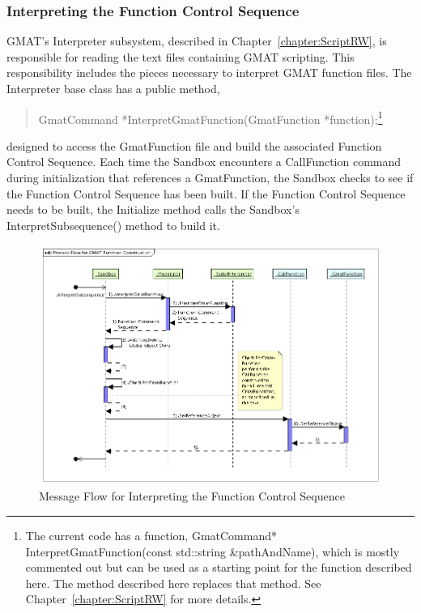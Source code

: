 \subsubsection{Interpreting the Function Control Sequence}

GMAT's Interpreter subsystem, described in Chapter~\ref{chapter:ScriptRW}, is responsible for
reading the text files containing GMAT scripting.  This responsibility includes the pieces
necessary to interpret GMAT function files.  The Interpreter base class has a public method,

\begin{quote}
GmatCommand *InterpretGmatFunction(GmatFunction *function);\footnote{The current code has a
function, GmatCommand* InterpretGmatFunction(const std::string \&pathAndName), which is mostly
commented out but can be used as a starting point for the function described here.  The method
described here replaces that method. See Chapter~\ref{chapter:ScriptRW} for more details.}
\end{quote}

\noindent designed to access the GmatFunction file and build the associated Function Control
Sequence.  Each time the Sandbox encounters a CallFunction command during initialization that
references a GmatFunction, the Sandbox checks to see if the Function Control Sequence has been
built.  If the Function Control Sequence needs to be built, the Initialize method calls the
Sandbox's InterpretSubsequence() method to build it.

\begin{figure}[htb]
\begin{center}
\includegraphics[429,300]{Images/ProcessFlowforGMATFunctionConstruction.png}
\caption{\label{figure:FunctionInterpreterFlow}Message Flow for Interpreting the Function Control
Sequence}
\end{center}
\end{figure}

